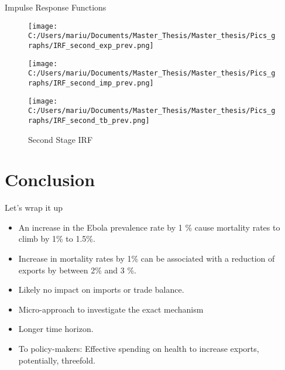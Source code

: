 \documentclass[11pt]{beamer}
\begin{document}
\begin{frame}{Impulse Response Functions}
\begin{figure}[!ht]
\begin{center}
\begin{minipage}[t]{\textwidth}
\begin{minipage}[t]{0.3\linewidth}\vspace{0pt} 
\texttt{[image: C:/Users/mariu/Documents/Master\_Thesis/Master\_thesis/Pics\_graphs/IRF\_second\_exp\_prev.png]}\\
\end{minipage}\hfill%
\begin{minipage}[t]{0.3\linewidth}\vspace{0pt} 
\texttt{[image: C:/Users/mariu/Documents/Master\_Thesis/Master\_thesis/Pics\_graphs/IRF\_second\_imp\_prev.png]}\\
\end{minipage}\hfill%
\begin{minipage}[t]{0.3\linewidth}\vspace{0pt} 
\texttt{[image: C:/Users/mariu/Documents/Master\_Thesis/Master\_thesis/Pics\_graphs/IRF\_second\_tb\_prev.png]}\\
\end{minipage}\hfill%
\caption{Second Stage IRF\label{Second Stage IRF}}
\end{minipage}
\end{center}
\end{figure}
\end{frame}

\section{Conclusion}
\begin{frame}{Let's wrap it up}
\begin{itemize}
\item An increase in the Ebola prevalence rate by 1 \% cause mortality rates to climb by 1\% to 1.5\%.  \\
\item Increase in mortality rates by 1\% can be associated with a reduction of exports by between 2\% and 3 \%. \\
\item Likely no impact on imports or trade balance. \\
\item Micro-approach to investigate the exact mechanism \\
\item Longer time horizon. \\
\item To policy-makers: Effective spending on health to increase exports, potentially, threefold.
\end{itemize}
\end{frame}
\end{document}
